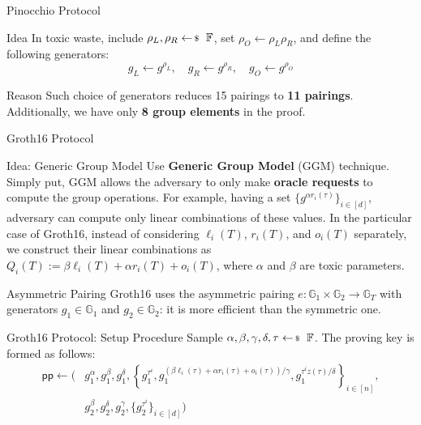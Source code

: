 \documentclass{zkdl-presentation-template}
\begin{document}
    \begin{frame}{Pinocchio Protocol}
        \begin{block}{Idea}
            In toxic waste, include $\rho_L,\rho_R \leftarrowS \mathbb{F}$, set $\rho_O \gets \rho_L\rho_R$, and define the following generators:
            \begin{equation*}
                g_L \gets g^{\rho_L}, \quad g_R \gets g^{\rho_R}, \quad g_O \gets g^{\rho_O}
            \end{equation*}
        \end{block}
        \pause

        \begin{remarkblock}{Reason}
            Such choice of generators reduces 15 pairings to \textbf{11 pairings}. Additionally, we have only \textbf{8 group elements} in the proof.
        \end{remarkblock}
    \end{frame}

    \begin{frame}{Groth16 Protocol}
        \begin{block}{Idea: Generic Group Model}
            Use \textbf{Generic Group Model} (GGM) technique. Simply put, GGM allows the adversary to only make \textbf{oracle requests} to compute the group operations. For example, having a set $\{g^{\alpha r_i(\tau)}\}_{i \in [d]}$, adversary can compute only linear combinations of these values. In the particular case of Groth16, instead of considering $\ell_i(T)$, $r_i(T)$, and $o_i(T)$ separately, we construct their linear combinations as $Q_i(T) := \beta \ell_i(T) + \alpha r_i(T) + o_i(T)$, where $\alpha$ and $\beta$ are toxic parameters.
        \end{block}
        \pause

        \begin{remarkblock}{Asymmetric Pairing}
            Groth16 uses the asymmetric pairing $e: \mathbb{G}_1 \times \mathbb{G}_2 \to \mathbb{G}_T$ with generators $g_1 \in \mathbb{G}_1$ and $g_2 \in \mathbb{G}_2$: it is more efficient than the symmetric one.
        \end{remarkblock}
    \end{frame}

    \begin{frame}{Groth16 Protocol: Setup Procedure}
        Sample $\alpha,\beta,\gamma,\delta,\tau \leftarrowS \mathbb{F}$. The proving key is formed as follows:
        \begin{align*}
            \mathsf{pp} \gets \Big(&g_1^{\alpha},g_1^{\beta},g_1^{\delta},\left\{g_1^{\tau^i},g_1^{(\beta \ell_i(\tau) + \alpha r_i(\tau) + o_i(\tau))/\gamma}, g_1^{\tau^i z(\tau)/\delta}\right\}_{i \in [n]}, \\
            &g_2^{\beta}, g_2^{\delta}, g_2^{\gamma}, \{g_2^{\tau^i}\}_{i \in [d]}\Big)
        \end{align*}
    \end{frame}
\end{document}
